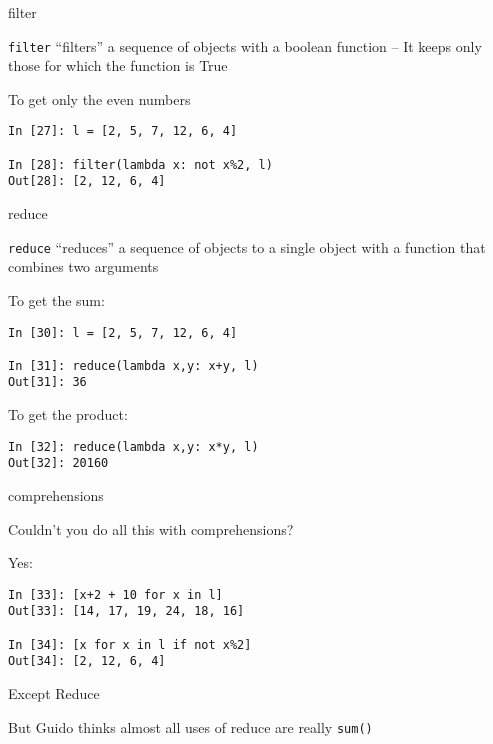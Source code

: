 \documentclass{beamer}
\begin{document}
\begin{frame}[fragile]{filter}

{\Large \verb|filter| ``filters'' a sequence of objects with a boolean function -- 
It keeps only those for which the function is True
}

\vfill
{\Large To get only the even numbers}

\begin{verbatim}
In [27]: l = [2, 5, 7, 12, 6, 4]

In [28]: filter(lambda x: not x%2, l)
Out[28]: [2, 12, 6, 4]
\end{verbatim}

\end{frame} 

\begin{frame}[fragile]{reduce}

{\Large \verb|reduce| ``reduces'' a sequence of objects to a single object with a function that combines two arguments}

\vfill
{\Large To get the sum:}

\begin{verbatim}
In [30]: l = [2, 5, 7, 12, 6, 4]

In [31]: reduce(lambda x,y: x+y, l)
Out[31]: 36
\end{verbatim}

{\Large To get the product:}

\begin{verbatim}
In [32]: reduce(lambda x,y: x*y, l)
Out[32]: 20160
\end{verbatim}

\end{frame} 

\begin{frame}[fragile]{comprehensions}

{\Large Couldn't you do all this with comprehensions?}

\vfill
{\LARGE Yes:}
\begin{verbatim}
In [33]: [x+2 + 10 for x in l]
Out[33]: [14, 17, 19, 24, 18, 16]

In [34]: [x for x in l if not x%2]
Out[34]: [2, 12, 6, 4]
\end{verbatim}

{\Large Except Reduce}

\vfill
But Guido thinks almost all uses of reduce are really \verb|sum()|
\end{frame} 
\end{document}
